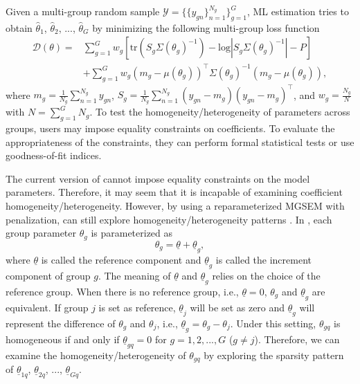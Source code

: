 \documentclass[nojss]{jss}
\begin{document}
Given a multi-group random sample $\mathcal{Y} = \{ \{y_{gn}\}_{n=1}^{N_g} \}_{g=1}^{G}$, ML estimation tries to obtain $\hat{\theta}_1$, $\hat{\theta}_2$, ..., $\hat{\theta}_G$ by minimizing the following multi-group loss function
%
\begin{equation} \label{eq:mgsem}
\begin{aligned}
\mathcal{D}(\theta) = &  \sum_{g=1}^G w_g \left [\mathrm{tr}(S_g \Sigma(\theta_g)^{-1} )- \mathrm{log}| S_g \Sigma(\theta_g)^{-1}| -P \right] \\
& + \sum_{g=1}^G w_g  (m_g-\mu(\theta_g))^\top \Sigma(\theta_g)^{-1} (m_g-\mu(\theta_g)) ,
\end{aligned}
\end{equation}
%
where $m_g=\frac{1}{N_g}\sum_{n=1}^{N_g} y_{gn}$, $S_g = \frac{1}{N_g}\sum_{n=1}^{N_g} (y_{gn}-m_g)(y_{gn}-m_g)^\top$, and $w_g=\frac{N_g}{N}$ with $N=\sum_{g=1}^G N_g$. To test the homogeneity/heterogeneity of parameters across groups, users may impose equality constraints on coefficients. To evaluate the appropriateness of the constraints, they can perform formal statistical tests or use goodness-of-fit indices.

The current version of  cannot impose equality constraints on the model parameters. Therefore, it may seem that it is incapable of examining coefficient homogeneity/heterogeneity. However, by using a reparameterized MGSEM with penalization,  can still explore homogeneity/heterogeneity patterns \citep[see][]{Huang2018}. In , each group parameter $\theta_g$ is parameterized as
%
\begin{equation}
\theta_g = \underline{\theta} + \underline{\theta}_g,
\end{equation}
%
where $\underline{\theta}$ is called the reference component and $\underline{\theta}_g$ is called the increment component of group $g$. The meaning of $\underline{\theta}$ and $\underline{\theta}_g$ relies on the choice of the reference group. When there is no reference group, i.e., $\underline{\theta}=0$, $\theta_g$ and $\underline{\theta}_g$ are equivalent. If group $j$ is set as reference, $\underline{\theta}_j$ will be set as zero and $\underline{\theta}_g$ will represent the difference of $\theta_g$ and $\theta_j$, i.e., $\underline{\theta}_g = \theta_g - \theta_j$. Under this setting, $\theta_{gq}$ is homogeneous if and only if $\underline{\theta}_{gq}=0$ for $g=1,2,...,G$ ($g \neq j$). Therefore, we can examine the homogeneity/heterogeneity of $\theta_{gq}$ by exploring the sparsity pattern of $\underline{\theta}_{1q}$, $\underline{\theta}_{2q}$, ..., $\underline{\theta}_{Gq}$.
\end{document}

